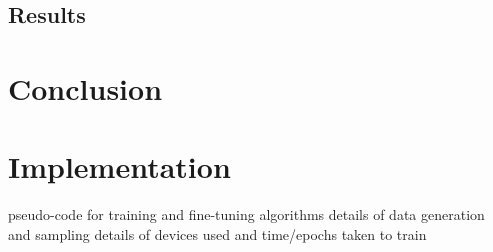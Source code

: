 \documentclass[12pt,letterpaper]{article}
\begin{document}
\begin{multicols}{2}
\subsection{Results}

\section{Conclusion}

\nocite{*}



\section{Implementation}
pseudo-code for training and fine-tuning algorithms
details of data generation and sampling
details of devices used and time/epochs taken to train
\end{multicols}
\end{document}
